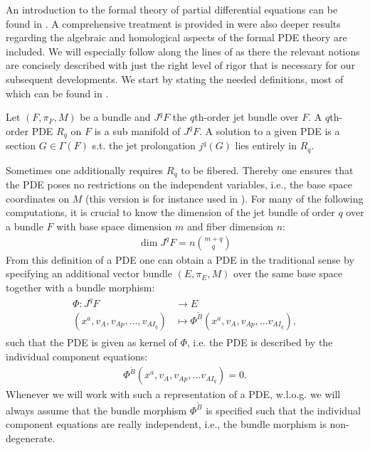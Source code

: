 An introduction to the formal theory of partial differential equations can be found in \cite{saunders_1989}. A comprehensive treatment is provided in \cite{seiler2009involution} were also deeper results regarding the algebraic and homological aspects of the formal PDE theory are included. We will especially follow along the lines of \cite{seiler1994analysis} as there the relevant notions are concisely described with just the right level of rigor that is necessary for our subsequent developments. We start by stating the needed definitions, most of which can be found in \cite{seiler1994analysis}.
\begin{definition}[PDE]
Let $(F,\pi_F,M)$ be a bundle and $J^qF$ the $q$th-order jet bundle over $F$. A $q$th-order PDE $R_q$ on $F$ is a  sub manifold of $J^qF$. A solution to a given PDE is a section $G \in \Gamma(F)$ s.t. the jet prolongation $j^q(G)$ lies entirely in $R_q$.  
\end{definition}
Sometimes one additionally requires $R_q$ to be fibered. Thereby one ensures that the PDE poses no restrictions on the independent variables, i.e., the base space coordinates on $M$ (this version is for instance used in \cite{seiler1994analysis}).
For many of the following computations, it is crucial to know the dimension of the jet bundle of order $q$ over a bundle $F$ with base space dimension $m$ and fiber dimension $n$:
\begin{align}
    \operatorname{dim}J^qF = n\binom{m+q}{q}
\end{align}
From this definition of a PDE one can obtain a PDE in the traditional sense by specifying an additional vector bundle $(E,\pi_E,M)$ over the same base space together with a bundle morphism:
\begin{align}
    \begin{aligned}
    \Phi : J^qF &\longrightarrow E\\
    (x^a, v_A, v_{Ap},...,v_{AI_q}) &\longmapsto \Phi^{\tilde{B}}(x^a, v_A, v_{Ap},...v_{AI_q}),
    \end{aligned}
\end{align}
such that the PDE is given as kernel of $\Phi$, i.e.
the PDE is described by the individual component  equations:
\begin{align}
    \Phi^{\tilde{B}}(x^a, v_A, v_{Ap},...v_{AI_q}) = 0.
\end{align}
Whenever we will work with such a representation of a PDE, w.l.o.g. we will always assume that the bundle morphism $\Phi^{\tilde{B}}$ is specified such that the individual component equations are really independent, i.e., the bundle morphism is non-degenerate. 

